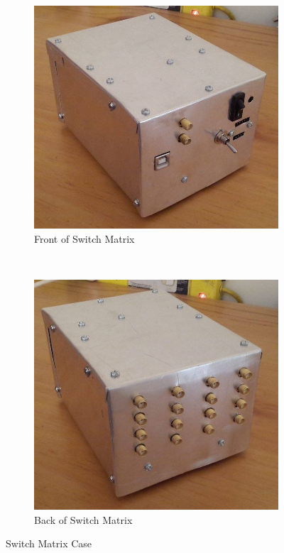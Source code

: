 \documentclass[12pt,openany,a4paper]{book}
\begin{document}
\begin{figure}[H]
    \centering
    \begin{subfigure}[t]{0.5\textwidth}
        \centering
        \includegraphics[width=1\textwidth]{box-front.jpg}
        \caption{Front of Switch Matrix}
    \end{subfigure}%
    ~ 
    \begin{subfigure}[t]{0.5\textwidth}
        \centering
        \includegraphics[width=1\textwidth]{box-back.jpg}
        \caption{Back of Switch Matrix}
    \end{subfigure}
    \caption{Switch Matrix Case}
    \label{fig:case}
\end{figure}
\end{document}

